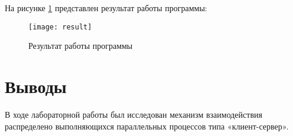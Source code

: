 \documentclass[a4paper,14pt]{extarticle}
\begin{document}
На рисунке \ref{fig:result} представлен результат работы программы:
\begin{figure}[H]
    \centering
    \texttt{[image: result]}
    \caption{Результат работы программы}
    \label{fig:result}
\end{figure}

\section*{Выводы}
В ходе лабораторной работы был исследован механизм взаимодействия распределено
выполняющихся параллельных процессов типа «клиент-сервер».
\end{document}

